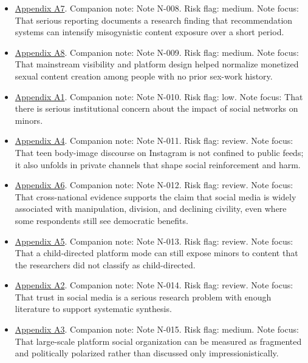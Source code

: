 \documentclass[
  american,
  11pt,
  letterpaper,
]{article}
\providecommand{\tightlist}{%
  \setlength{\itemsep}{0pt}\setlength{\parskip}{0pt}}
\begin{document}
\begin{itemize}
\tightlist
\item
  \hyperref[appendix-a7-social-media-algorithms-amplifying-misogynistic-content]{Appendix
  A7}. Companion note: Note N-008. Risk flag: medium. Note focus: That
  serious reporting documents a research finding that recommendation
  systems can intensify misogynistic content exposure over a short
  period.
\item
  \hyperref[appendix-a8-nudes-shouldn-t-i-charge-for-these-motivations-of-new-sexual-content-creators-on-onlyfans]{Appendix
  A8}. Companion note: Note N-009. Risk flag: medium. Note focus: That
  mainstream visibility and platform design helped normalize monetized
  sexual content creation among people with no prior sex-work history.
\item
  \hyperref[appendix-a1-social-media-and-youth-mental-health-the-u-s-surgeon-general-s-advisory]{Appendix
  A1}. Companion note: Note N-010. Risk flag: low. Note focus: That
  there is serious institutional concern about the impact of social
  networks on minors.
\item
  \hyperref[appendix-a4-unfiltered-how-teens-engage-in-body-image-and-shaming-discussions-via-instagram-direct-messages-dms]{Appendix
  A4}. Companion note: Note N-011. Risk flag: review. Note focus: That
  teen body-image discourse on Instagram is not confined to public
  feeds; it also unfolds in private channels that shape social
  reinforcement and harm.
\item
  \hyperref[appendix-a6-social-media-seen-as-mostly-good-for-democracy-across-many-nations-but-u-s-is-a-major-outlier]{Appendix
  A6}. Companion note: Note N-012. Risk flag: review. Note focus: That
  cross-national evidence supports the claim that social media is widely
  associated with manipulation, division, and declining civility, even
  where some respondents still see democratic benefits.
\item
  \hyperref[appendix-a5-when-kids-mode-isn-t-for-kids-investigating-tiktok-s-under-13-experience]{Appendix
  A5}. Companion note: Note N-013. Risk flag: review. Note focus: That a
  child-directed platform mode can still expose minors to content that
  the researchers did not classify as child-directed.
\item
  \hyperref[appendix-a2-what-do-we-mean-when-we-talk-about-trust-in-social-media-a-systematic-review]{Appendix
  A2}. Companion note: Note N-014. Risk flag: review. Note focus: That
  trust in social media is a serious research problem with enough
  literature to support systematic synthesis.
\item
  \hyperref[appendix-a3-quantifying-social-organization-and-political-polarization-in-online-platforms]{Appendix
  A3}. Companion note: Note N-015. Risk flag: medium. Note focus: That
  large-scale platform social organization can be measured as fragmented
  and politically polarized rather than discussed only
  impressionistically.
\end{itemize}
\end{document}
